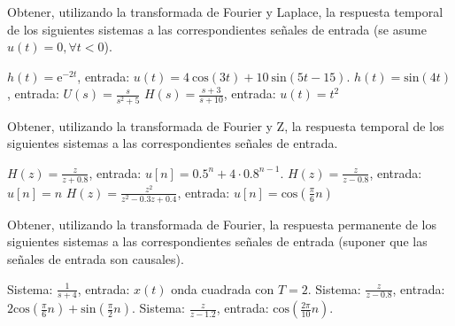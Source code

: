 \documentclass[10pt,twoside,spanish,a4paper]{article}
\begin{document}
\begin{itemize}
		\itemP Obtener, utilizando la transformada de Fourier y Laplace, la respuesta temporal de los siguientes sistemas a las correspondientes señales de entrada (se asume $u(t)=0, \forall t<0$).
		\begin{itemize}
				\itemB $h(t)=\textrm{e}^{-2t}$, entrada: $u(t)=4~\textrm{cos}(3t)+10~\textrm{sin}(5t-15)$.
				\itemB $h(t)=\textrm{sin}(4t)$, entrada: $U(s)=\frac{s}{s^2+5}$
				\itemB $H(s)=\frac{s+3}{s+10}$, entrada: $u(t)=t^2$
		\end{itemize}
		
		\itemP Obtener, utilizando la transformada de Fourier y Z, la respuesta temporal de los siguientes sistemas a las correspondientes señales de entrada.
		\begin{itemize}
				\itemB $H(z)=\frac{z}{z+0.8}$, entrada: $u[n]=0.5^n + 4\cdot0.8^{n-1}$.
				\itemB $H(z)=\frac{z}{z-0.8}$, entrada: $u[n]=n$
				\itemB $H(z)=\frac{z^2}{z^2-0.3z+0.4}$, entrada: $u[n]=\textrm{cos}(\frac{\pi}{6}n)$
		\end{itemize}
		
		\itemP Obtener, utilizando la transformada de Fourier, la respuesta permanente de los siguientes sistemas a las correspondientes señales de entrada (suponer que las señales de entrada son causales).
		\begin{itemize}
				\itemB Sistema: $\frac{1}{s+4}$, entrada: $x(t)$ onda cuadrada con $T=2$.
				\itemB Sistema: $\frac{z}{z-0.8}$, entrada: $2\textrm{cos}(\frac{\pi}{6}n)+\textrm{sin}(\frac{\pi}{2}n)$.
				\itemB Sistema: $\frac{z}{z-1.2}$, entrada: $\textrm{cos}(\frac{2\pi}{10}n)$.
		\end{itemize}
	\end{itemize}
	
\end{document}

